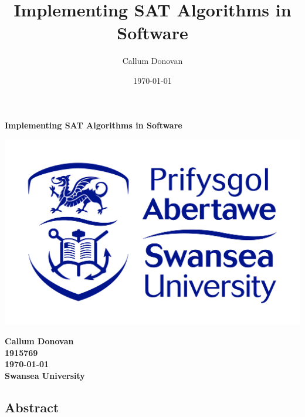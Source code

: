 \documentclass{article}
\title{\bfseries Implementing SAT Algorithms in Software}
\author{Callum Donovan}
\date{ \today }
\begin{document}
\begin{titlepage}
    \begin{center}
        \Large{\bfseries Implementing SAT Algorithms in Software} \\
        \vspace*{\fill}
        \begin{center}
            \includegraphics[scale=0.15]{swan.jpg}
        \end{center}
        \vspace*{\fill}
        \bfseries{\large Callum Donovan \\
            1915769 \\
            \today \\
            Swansea University \\}
    \end{center}
\end{titlepage}

\thispagestyle{empty}
\begin{center}
\section*{Abstract}
\end{center}
\end{document}
